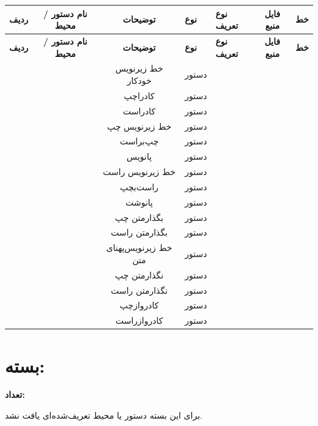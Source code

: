\documentclass[a4paper,landscape]{article}
\begin{document}
\begin{xltabular}{\textwidth}{c c c l l c c}
\hline
\textbf{ردیف} & \textbf{نام دستور / محیط} & \textbf{توضیحات} & \textbf{نوع} & \textbf{نوع تعریف} & \textbf{فایل منبع} & \textbf{خط} \\
\hline
\endfirsthead
\hline
\textbf{ردیف} & \textbf{نام دستور / محیط} & \textbf{توضیحات} & \textbf{نوع} & \textbf{نوع تعریف} & \textbf{فایل منبع} & \textbf{خط} \\
\hline
\endhead
\hline
\endfoot
\hline
\endlastfoot
{} &  & ﺧﻂ ﺯﯾﺮﻧﻮﯾﺲ ﺧﻮﺩﮐﺎﺭ & دستور &  &  &  \\
 &  & ﮐﺎﺩﺭﺍﭼﭗ & دستور &  &  &  \\
 &  & ﮐﺎﺩﺭﺍﺳﺖ & دستور &  &  &  \\
 &  & ﺧﻂ ﺯﯾﺮﻧﻮﯾﺲ ﭼﭗ & دستور &  &  &  \\
 &  & ﭼﭗﺑﺮﺍﺳﺖ & دستور &  &  &  \\
 &  & ﭘﺎﻧﻮﯾﺲ & دستور &  &  &  \\
 &  & ﺧﻂ ﺯﯾﺮﻧﻮﯾﺲ ﺭﺍﺳﺖ & دستور &  &  &  \\
 &  & ﺭﺍﺳﺖﺑﭽﭗ & دستور &  &  &  \\
 &  & ﭘﺎﻧﻮﺷﺖ & دستور &  &  &  \\
 &  & ﺑﮕﺬﺍﺭﻣﺘﻦ ﭼﭗ & دستور &  &  &  \\
 &  & ﺑﮕﺬﺍﺭﻣﺘﻦ ﺭﺍﺳﺖ & دستور &  &  &  \\
 &  & ﺧﻂ ﺯﯾﺮﻧﻮﯾﺲﭘﻬﻨﺎﯼ ﻣﺘﻦ & دستور &  &  &  \\
 &  & ﻧﮕﺬﺍﺭﻣﺘﻦ ﭼﭗ & دستور &  &  &  \\
 &  & ﻧﮕﺬﺍﺭﻣﺘﻦ ﺭﺍﺳﺖ & دستور &  &  &  \\
 &  & ﮐﺎﺩﺭﻭﺍﺯﭼﭗ & دستور &  &  &  \\
 &  & ﮐﺎﺩﺭﻭﺍﺯﺭﺍﺳﺖ & دستور &  &  &  \\
\end{xltabular}

\section*{بسته: }
\textbf{تعداد: }

برای این بسته دستور یا محیط تعریف‌شده‌ای یافت نشد.
\end{document}
